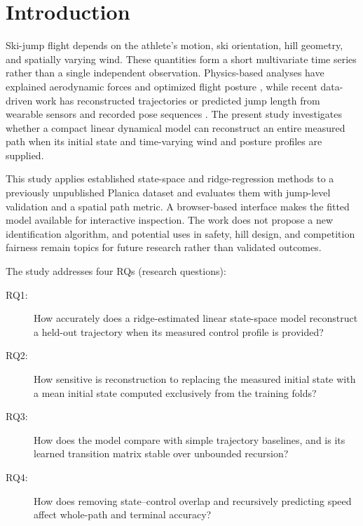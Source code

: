 \documentclass[11pt,twoside,a4paper]{article}
\begin{document}
\maketitle

\section{Introduction}

Ski-jump flight depends on the athlete's motion, ski orientation, hill geometry, and spatially varying wind. These quantities form a short multivariate time series rather than a single independent observation. Physics-based analyses have explained aerodynamic forces and optimized flight posture \cite{muller1996dynamics,meile2006aerodynamics,seo2004optimal}, while recent data-driven work has reconstructed trajectories or predicted jump length from wearable sensors and recorded pose sequences \cite{fang2020trajectory,schwinn2022xlength,zecha2018convolutional}. The present study investigates whether a compact linear dynamical model can reconstruct an entire measured path when its initial state and time-varying wind and posture profiles are supplied.

This study applies established state-space and ridge-regression methods to a previously unpublished Planica dataset and evaluates them with jump-level validation and a spatial path metric. A browser-based interface makes the fitted model available for interactive inspection. The work does not propose a new identification algorithm, and potential uses in safety, hill design, and competition fairness remain topics for future research rather than validated outcomes.

The study addresses four RQs (research questions):
\begin{description}
  \item[RQ1:] How accurately does a ridge-estimated linear state-space model reconstruct a held-out trajectory when its measured control profile is provided?
  \item[RQ2:] How sensitive is reconstruction to replacing the measured initial state with a mean initial state computed exclusively from the training folds?
  \item[RQ3:] How does the model compare with simple trajectory baselines, and is its learned transition matrix stable over unbounded recursion?
  \item[RQ4:] How does removing state--control overlap and recursively predicting speed affect whole-path and terminal accuracy?
\end{description}
\end{document}
